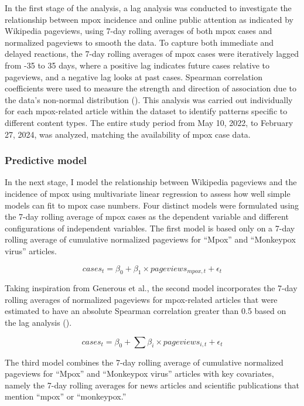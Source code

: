 \documentclass[
  12pt,
]{article}
\begin{document}
In the first stage of the analysis, a lag analysis was conducted to
investigate the relationship between mpox incidence and online public
attention as indicated by Wikipedia pageviews, using 7-day rolling
averages of both mpox cases and normalized pageviews to smooth the data.
To capture both immediate and delayed reactions, the 7-day rolling
averages of mpox cases were iteratively lagged from -35 to 35 days,
where a positive lag indicates future cases relative to pageviews, and a
negative lag looks at past cases. Spearman correlation coefficients were
used to measure the strength and direction of association due to the
data's non-normal distribution (). This analysis was carried out individually for each
mpox-related article within the dataset to identify patterns specific to
different content types. The entire study period from May 10, 2022, to
February 27, 2024, was analyzed, matching the availability of mpox case
data.

\subsubsection{Predictive model}\label{predictive-model}

In the next stage, I model the relationship between Wikipedia pageviews
and the incidence of mpox using multivariate linear regression to assess
how well simple models can fit to mpox case numbers. Four distinct
models were formulated using the 7-day rolling average of mpox cases as
the dependent variable and different configurations of independent
variables. The first model is based only on a 7-day rolling average of
cumulative normalized pageviews for ``Mpox'' and ``Monkeypox virus''
articles.~

\[
cases_t = \beta_0 + \beta_1 \times pageviews_{mpox, t}+ \epsilon_t
\]

Taking inspiration from Generous et al., the second model incorporates
the 7-day rolling averages of normalized pageviews for mpox-related
articles that were estimated to have an absolute Spearman correlation
greater than 0.5 based on the lag analysis
().~

\[
cases_t = \beta_0 + \sum \beta_i \times pageviews_{i, t}+ \epsilon_t
\]

The third model combines the 7-day rolling average of cumulative
normalized pageviews for ``Mpox'' and ``Monkeypox virus'' articles with
key covariates, namely the 7-day rolling averages for news articles and
scientific publications that mention ``mpox'' or ``monkeypox.''~
\end{document}
